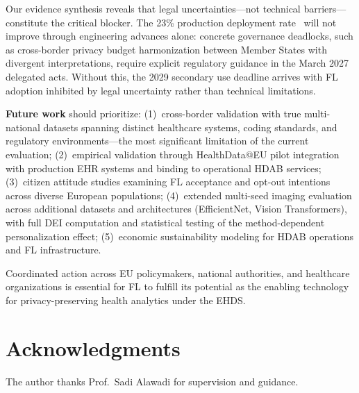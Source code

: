 \documentclass[conference,a4paper]{IEEEtran}
\begin{document}
Our evidence synthesis reveals that legal uncertainties---not technical barriers---constitute the critical blocker. The 23\% production deployment rate~\cite{frohlich2025reality} will not improve through engineering advances alone: concrete governance deadlocks, such as cross-border privacy budget harmonization between Member States with divergent interpretations, require explicit regulatory guidance in the March 2027 delegated acts. Without this, the 2029 secondary use deadline arrives with FL adoption inhibited by legal uncertainty rather than technical limitations.

\textbf{Future work} should prioritize: (1)~cross-border validation with true multi-national datasets spanning distinct healthcare systems, coding standards, and regulatory environments---the most significant limitation of the current evaluation; (2)~empirical validation through HealthData@EU pilot integration with production EHR systems and binding to operational HDAB services; (3)~citizen attitude studies examining FL acceptance and opt-out intentions across diverse European populations; (4)~extended multi-seed imaging evaluation across additional datasets and architectures (EfficientNet, Vision Transformers), with full DEI computation and statistical testing of the method-dependent personalization effect; (5)~economic sustainability modeling for HDAB operations and FL infrastructure.

Coordinated action across EU policymakers, national authorities, and healthcare organizations is essential for FL to fulfill its potential as the enabling technology for privacy-preserving health analytics under the EHDS.

\section*{Acknowledgments}
The author thanks Prof.~Sadi Alawadi for supervision and guidance.


\end{document}
